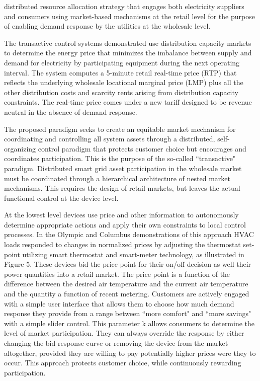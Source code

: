 distributed resource allocation strategy that engages both electricity suppliers and consumers using market-based mechanisms at the retail level for the purpose of enabling demand response by the utilities at the wholesale level.

The transactive control systems demonstrated use distribution capacity markets to determine the energy price that minimizes the imbalance between supply and demand for electricity by participating equipment during the next operating interval. The system computes a 5-minute retail real-time price (RTP) that reflects the underlying wholesale locational marginal price (LMP) plus all the other distribution costs and scarcity rents arising from distribution capacity constraints. The real-time price comes under a new tariff designed to be revenue neutral in the absence of demand response.

The proposed paradigm seeks to create an equitable market mechanism for coordinating and controlling all system assets through a distributed, self-organizing control
paradigm that protects customer choice but encourages and coordinates participation. This is the purpose of the so-called ``transactive" paradigm. Distributed smart grid asset participation in the wholesale market must be coordinated through a hierarchical architecture of nested market mechanisms. This requires the design of retail markets, but leaves the actual functional control at the device level.

At the lowest level devices use price and other information to autonomously determine appropriate actions and apply their own constraints to local control processes. In the Olympic and Columbus demonstrations of this approach HVAC loads responded to changes in normalized prices by adjusting the thermostat set-point utilizing smart thermostat and smart-meter technology, as illustrated in Figure 5. These devices bid the price point for their on/off decision as well their power quantities into a retail market. The price point is a function of the difference between the desired air temperature and the current air temperature and the quantity a function of recent metering. Customers are actively engaged with a simple user interface that allows them to choose how much demand response they provide from a range between ``more comfort" and ``more savings" with a simple slider control. This parameter k allows consumers to determine the level of market participation. They can always override the
response by either changing the bid response curve or removing the device from the market altogether, provided they are willing to pay potentially higher prices were they to occur. This approach protects customer choice, while continuously rewarding participation.

